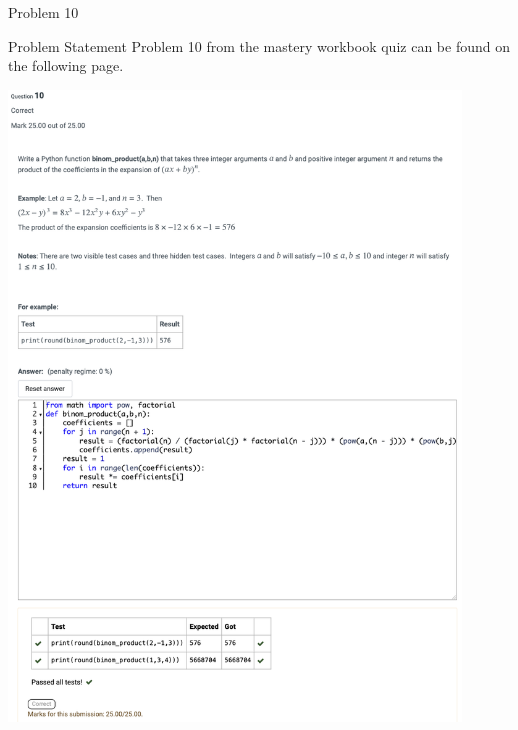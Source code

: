 \begin{problem}{Problem 10}
    \begin{statement}{Problem Statement}
        Problem 10 from the mastery workbook quiz can be found on the following page.
    \end{statement}
    \begin{Highlight}[Solution]
        \begin{center}
            \includegraphics[width = 0.90\textwidth]{Images/Problem 10.png}
        \end{center}
    \end{Highlight}
\end{problem}

